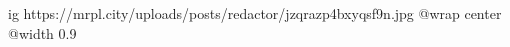  
 
 
 
 

\ifcmt
  ig https://mrpl.city/uploads/posts/redactor/jzqrazp4bxyqsf9n.jpg
  @wrap center
  @width 0.9
\fi
